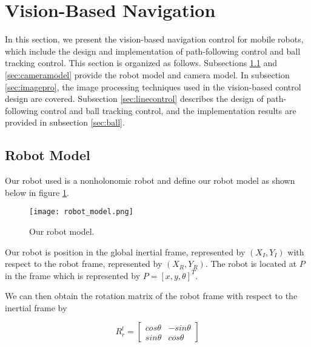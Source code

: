 \documentclass[12pt]{article}
\begin{document}
\newpage
\section{Vision-Based Navigation}


In this section, we present the vision-based navigation control for mobile robots, which include the design and implementation of path-following control and ball tracking control. This section is organized as follows. Subsections \ref{sec:robotmodel} and \ref{sec:cameramodel} provide the robot model and camera model. In subsection \ref{sec:imagepro}, the image processing techniques used in the vision-based control design are covered. Subsection \ref{sec:linecontrol} describes the design of path-following control and ball tracking control, and the implementation results are provided in subsection \ref{sec:ball}.



\subsection{Robot Model} \label{sec:robotmodel}

Our robot used is a nonholonomic robot and define our robot model as shown below in figure \ref{fig.model}.

\begin{figure}[htp!]
	\begin{center}
		\texttt{[image: robot\_model.png]}
		\caption{Our robot model.}  \label{fig.model}
	\end{center}
\end{figure}

Our robot is position in the global inertial frame, represented by $(X_I, Y_I)$ with respect to the robot frame, represented by $(X_R, Y_R)$. The robot is located at $P$ in the frame which is represented by $P = [x,y,\theta]^T$.

We can then obtain the rotation matrix of the robot frame with respect to the inertial frame by

\[R_r^l = \left[\begin{matrix} cos\theta & -sin \theta \\ sin\theta & cos \theta \end{matrix}\right]\] \label{eq:matrix} 
\end{document}
